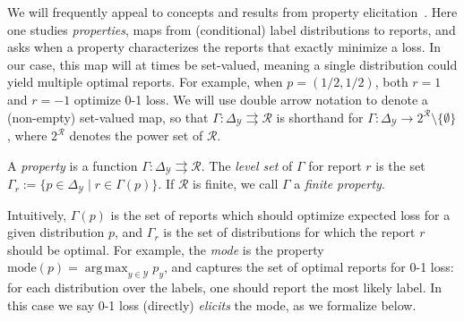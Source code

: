 \documentclass[twoside,11pt]{article}
\newcommand{\Comments}{1}
\newcommand{\mytodo}[2]{\ifnum\Comments=1%
  \todo[linecolor=#1!80!black,backgroundcolor=#1,bordercolor=#1!80!black]{#2}\fi}
\newcommand{\raft}[1]{\mytodo{green!20!white}{RF: #1}}
\newcommand{\jessiet}[1]{\mytodo{teal!20!white}{JF: #1}}
\newcommand{\mode}{\mathrm{mode}}
\newcommand{\simplex}{\Delta_\Y}
\newcommand{\R}{\mathcal{R}}
\newcommand{\Y}{\mathcal{Y}}
\newcommand{\toto}{\rightrightarrows}
\DeclareMathOperator*{\argmax}{arg\,max}
\begin{document}
We will frequently appeal to concepts and results from property elicitation~\citep{savage1971elicitation,osband1985information-eliciting,lambert2008eliciting,gneiting2011making,steinwart2014elicitation,frongillo2015vector-valued,lambert2018elicitation}.
Here one studies \emph{properties}, maps from (conditional) label distributions to reports, and asks when a property characterizes the reports that exactly minimize a loss.
In our case, this map will at times be set-valued, meaning a single distribution could yield multiple optimal reports.
For example, when $p=(1/2,1/2)$, both $r=1$ and $r=-1$ optimize 0-1 loss.
We will use double arrow notation to denote a (non-empty) set-valued map, so that $\Gamma: \simplex \toto \R$ is shorthand for $\Gamma: \simplex \to 2^{\R} \setminus \{\emptyset\}$, where $2^\R$ denotes the power set of $\R$.

\begin{definition}\label{def:property}
  A \emph{property} is a function $\Gamma:\simplex\toto\R$.
  The \emph{level set} of $\Gamma$ for report $r$ is the set $\Gamma_r := \{p \in \simplex \mid r \in \Gamma(p)\}$.
  If $\R$ is finite, we call $\Gamma$ a \emph{finite property}.
\end{definition}

Intuitively, $\Gamma(p)$ is the set of reports which should optimize expected loss for a given distribution $p$, and $\Gamma_r$ is the set of distributions for which the report $r$ should be optimal.
For example, the \emph{mode} is the %
property $\mode(p) = \argmax_{y\in\Y} p_y$, and captures the set of optimal reports for 0-1 loss: for each distribution over the labels, one should report the most likely label.
In this case we say 0-1 loss (directly) \emph{elicits} the mode, as we formalize below.
\end{document}
